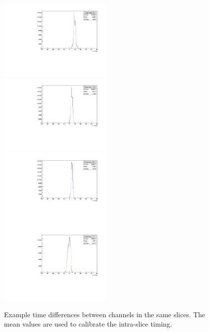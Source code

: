 \documentclass[12pt]{article}
\begin{document}
\begin{figure}
\centering
    \includegraphics[width=0.49\textwidth]{figures/timingPlots/intraSlice/Channels_8_0.pdf}~
    \includegraphics[width=0.49\textwidth]{figures/timingPlots/intraSlice/Channels_12_6.pdf}\\
    \includegraphics[width=0.49\textwidth]{figures/timingPlots/intraSlice/Channels_23_3.pdf}~
    \includegraphics[width=0.49\textwidth]{figures/timingPlots/intraSlice/Channels_17_7.pdf}
    \caption{\label{fig:timeDiffIntraSlice} Example time differences between channels in the same slices. The mean values are used to calibrate the intra-slice timing.}
\end{figure}
\end{document}
